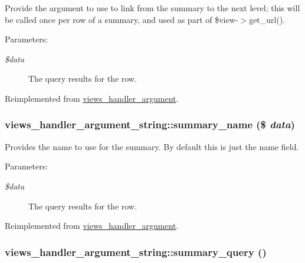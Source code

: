 Provide the argument to use to link from the summary to the next level; this will be called once per row of a summary, and used as part of \$view-$>$get\_\-url().

\begin{Desc}
\item[Parameters:]
\begin{description}
\item[{\em \$data}]The query results for the row. \end{description}
\end{Desc}


Reimplemented from \hyperlink{classviews__handler__argument_ad03acefdb44288d7e6c7793bc33f66c}{views\_\-handler\_\-argument}.\hypertarget{classviews__handler__argument__string_8cc60c274ca743c78de23260edc3ee4a}{
\subsubsection[{summary\_\-name}]{\setlength{\rightskip}{0pt plus 5cm}views\_\-handler\_\-argument\_\-string::summary\_\-name (\$ {\em data})}}
\label{classviews__handler__argument__string_8cc60c274ca743c78de23260edc3ee4a}


Provides the name to use for the summary. By default this is just the name field.

\begin{Desc}
\item[Parameters:]
\begin{description}
\item[{\em \$data}]The query results for the row. \end{description}
\end{Desc}


Reimplemented from \hyperlink{classviews__handler__argument_4c55a340453eed4d35c69f7ac790cac1}{views\_\-handler\_\-argument}.\hypertarget{classviews__handler__argument__string_829ad5356d65f02a75af5d1e8374292b}{
\subsubsection[{summary\_\-query}]{\setlength{\rightskip}{0pt plus 5cm}views\_\-handler\_\-argument\_\-string::summary\_\-query ()}}
\label{classviews__handler__argument__string_829ad5356d65f02a75af5d1e8374292b}



